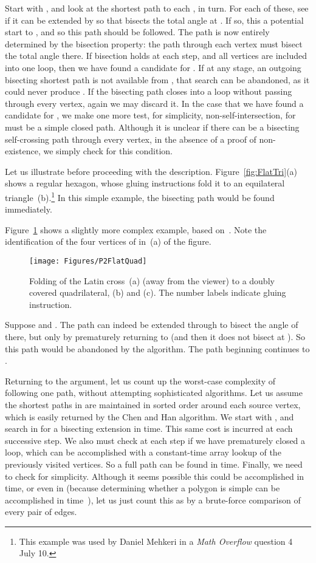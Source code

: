 \pdfoutput=1  \documentclass[]{article}
\newcommand{\figlab}[1]{\label{fig:#1}}
\newcommand{\figref}[1]{\ref{fig:#1}}
\begin{document}
Start with , and look at the shortest path 
to each ,  in turn.
For each of these, see if it can be extended by  so that
 bisects the total angle at .
If so, this a potential start to , and so this path should be followed.
The path is now entirely determined by the bisection property:
the path through each vertex must bisect the total angle there.
If bisection holds at each step, and all vertices are included into
one loop, then we have found a candidate for .
If at any stage, an outgoing bisecting shortest path is not available
from , that search can be abandoned, as it could never produce
.
If the bisecting path closes into a loop without passing through every
vertex, again we may discard it.
In the case that we have found a candidate for , we make
one more test, for simplicity, non-self-intersection, for  must be
a simple closed path.
Although it is unclear if there can be a bisecting
self-crossing path through every vertex, 
in the absence of a proof of non-existence,
we simply check for this condition.


Let us illustrate before proceeding with the description.
Figure~\figref{FlatTri}(a) shows a regular hexagon,
whose gluing instructions fold it to an equilateral triangle~(b).\footnote{This example was used by Daniel Mehkeri in a 
     \emph{Math Overflow} question 4 July 10.}
In this simple example, the bisecting path  would be found immediately.

Figure~\figref{P2FlatQuad} shows a slightly more complex example,
based on~\cite[Fig.~25.24]{do-gfalop-07}.
Note the identification of the four vertices of  in~(a) of the figure.
\begin{figure}[htbp]
\centering
\texttt{[image: Figures/P2FlatQuad]}
\caption{Folding of the Latin cross~(a) 
(away from the viewer) to a doubly covered quadrilateral,
(b) and (c).
The number labels indicate gluing instruction.
}
\figlab{P2FlatQuad}
\end{figure}
Suppose  and .
The path  can indeed be extended through  to bisect the
angle of  there,
but only by prematurely returning to  (and then it does not bisect
at ).  So this path would be abandoned by the algorithm.
The path beginning  continues to .

Returning to the argument, let us
count up the worst-case complexity of
following one  path, without attempting
sophisticated algorithms.
Let us assume the shortest paths in  are maintained in sorted
order
around each source vertex, which is easily returned by the Chen and
Han algorithm.
We start with , and search in  for a bisecting extension
 in  time.  This same cost is incurred at
each successive step.  We also must check 
at each step if we have prematurely
closed a loop, which can be accomplished with a constant-time array
lookup of the previously visited vertices.
So a full path  can be found in  time.
Finally, we need to check  for simplicity.  Although it seems
possible
this could be accomplished in  time, or even in 
(because determining whether a polygon is simple 
can be accomplished in  time~\cite{c-tsplt-91a}),
let us just count this as  by a brute-force comparison of
every
pair of edges.
\end{document}
